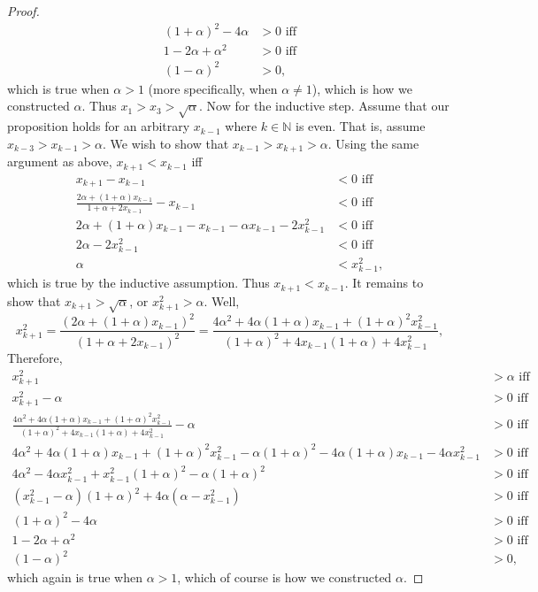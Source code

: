 \documentclass[11pt]{amsart}
\begin{document}
\begin{proof}
\begin{align*}
    (1 + \alpha)^{2} - 4\alpha & > 0 \text{ iff} \\
    1 - 2\alpha + \alpha^{2} & > 0 \text{ iff} \\
    (1 - \alpha)^{2} & > 0,
  \end{align*}
  which is true when $\alpha > 1$ (more specifically, when $\alpha \neq 1$), which is how we constructed $\alpha$. Thus $x_{1} > x_{3} > \sqrt{\alpha}$. Now for the inductive step. Assume that our proposition holds for an arbitrary $x_{k-1}$ where $k \in \mathbb{N}$ is even. That is, assume $x_{k-3} > x_{k-1} > \alpha$. We wish to show that $x_{k-1} > x_{k+1} > \alpha$. Using the same argument as above, $x_{k+1} < x_{k-1}$ iff 
  \begin{align*}
    x_{k+1} - x_{k-1} & < 0 \text{ iff} \\
    \frac{2\alpha + (1+\alpha)x_{k-1}}{1 + \alpha + 2x_{k-1}} - x_{k-1} & < 0 \text{ iff} \\
    2\alpha + (1+\alpha)x_{k-1} - x_{k-1} - \alpha x_{k-1} - 2x_{k-1}^{2} & < 0 \text{ iff} \\
    2\alpha - 2x_{k-1}^{2} & < 0 \text{ iff} \\
    \alpha & < x_{k-1}^{2},
  \end{align*}
  which is true by the inductive assumption. Thus $x_{k+1} < x_{k-1}$. It remains to show that $x_{k+1} > \sqrt{\alpha}$, or $x_{k+1}^{2} > \alpha$. Well,
  \[ x_{k+1}^{2} = \frac{(2\alpha + (1+\alpha)x_{k-1})^{2}}{(1 + \alpha + 2x_{k-1})^{2}} = \frac{4\alpha^{2} + 4\alpha(1+\alpha)x_{k-1} + (1+\alpha)^{2}x_{k-1}^{2}}{(1+\alpha)^{2} + 4x_{k-1}(1+\alpha) + 4x_{k-1}^{2}}, \]
  Therefore,
  \begin{align*}
    x_{k+1}^{2} & > \alpha \text{ iff} \\
    x_{k+1}^{2} - \alpha & > 0 \text{ iff} \\
    \frac{4\alpha^{2} + 4\alpha(1+\alpha)x_{k-1} + (1+\alpha)^{2}x_{k-1}^{2}}{(1+\alpha)^{2} + 4x_{k-1}(1+\alpha) + 4x_{k-1}^{2}} - \alpha & > 0 \text{ iff} \\
    4\alpha^{2} + 4\alpha(1+\alpha)x_{k-1} + (1+\alpha)^{2}x_{k-1}^{2} - \alpha(1+\alpha)^{2} - 4\alpha(1+\alpha)x_{k-1} - 4\alpha x_{k-1}^{2} & > 0\text{ iff} \\
    4\alpha^{2} - 4\alpha x_{k-1}^{2} + x_{k-1}^{2}(1+\alpha)^{2} - \alpha(1+\alpha)^{2} & > 0 \text{ iff} \\
    (x_{k-1}^{2} - \alpha)(1+\alpha)^{2} + 4\alpha(\alpha - x_{k-1}^{2}) & > 0 \text{ iff} \\
    (1 + \alpha)^{2} - 4\alpha & > 0 \text{ iff} \\
    1 - 2\alpha + \alpha^{2} & > 0 \text{ iff} \\
    (1 - \alpha)^{2} & > 0,
  \end{align*}
  which again is true when $\alpha > 1$, which of course is how we constructed $\alpha$.
\end{proof}
\end{document}

